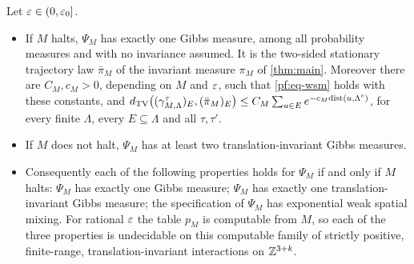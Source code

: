 \begin{corollary}\label{cor:gibbs}
Let $\varepsilon\in(0,\varepsilon_0]$.
\begin{itemize}
\item[(i)] If $M$ halts, $\Psi_M$ has exactly one Gibbs measure, among all probability measures and with no invariance assumed. It is the two-sided stationary trajectory law $\bar\pi_M$ of the invariant measure $\pi_M$ of \cref{thm:main}. Moreover there are $C_M,c_M>0$, depending on $M$ and $\varepsilon$, such that \eqref{pf:eq-wsm} holds with these constants, and $d_{\mathrm{TV}}\bigl((\gamma^\tau_{M,\Lambda})_E,(\bar\pi_M)_E\bigr)\le C_M\sum_{u\in E}e^{-c_M\mathrm{dist}(u,\Lambda^c)}$, for every finite $\Lambda$, every $E\subseteq\Lambda$ and all $\tau,\tau'$.
\item[(ii)] If $M$ does not halt, $\Psi_M$ has at least two translation-invariant Gibbs measures.
\item[(iii)] Consequently each of the following properties holds for $\Psi_M$ if and only if $M$ halts: $\Psi_M$ has exactly one Gibbs measure; $\Psi_M$ has exactly one translation-invariant Gibbs measure; the specification of $\Psi_M$ has exponential weak spatial mixing. For rational $\varepsilon$ the table $p_M$ is computable from $M$, so each of the three properties is undecidable on this computable family of strictly positive, finite-range, translation-invariant interactions on $\mathbb{Z}^{3+k}$.
\end{itemize}
\end{corollary}

